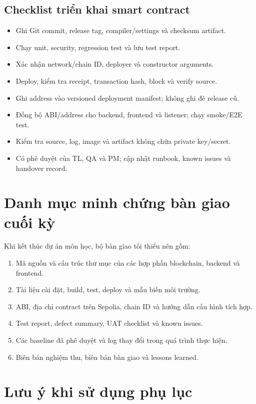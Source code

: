 \subsection{Checklist triển khai smart contract}

\begin{itemize}
  \item Ghi Git commit, release tag, compiler/settings và checksum artifact.
  \item Chạy unit, security, regression test và lưu test report.
  \item Xác nhận network/chain ID, deployer và constructor arguments.
  \item Deploy, kiểm tra receipt, transaction hash, block và verify source.
  \item Ghi address vào versioned deployment manifest; không ghi đè release cũ.
  \item Đồng bộ ABI/address cho backend, frontend và listener; chạy smoke/E2E test.
  \item Kiểm tra source, log, image và artifact không chứa private key/secret.
  \item Có phê duyệt của TL, QA và PM; cập nhật runbook, known issues và handover record.
\end{itemize}

\fi
\section{Danh mục minh chứng bàn giao cuối kỳ}
\iffalse

Khi kết thúc dự án môn học, bộ bàn giao tối thiểu nên gồm:

\begin{enumerate}
  \item Mã nguồn và cấu trúc thư mục của các hợp phần blockchain, backend và frontend.
  \item Tài liệu cài đặt, build, test, deploy và mẫu biến môi trường.
  \item ABI, địa chỉ contract trên Sepolia, chain ID và hướng dẫn cấu hình tích hợp.
  \item Test report, defect summary, UAT checklist và known issues.
  \item Các baseline đã phê duyệt và log thay đổi trong quá trình thực hiện.
  \item Biên bản nghiệm thu, biên bản bàn giao và lessons learned.
\end{enumerate}

\section{Lưu ý khi sử dụng phụ lục}

